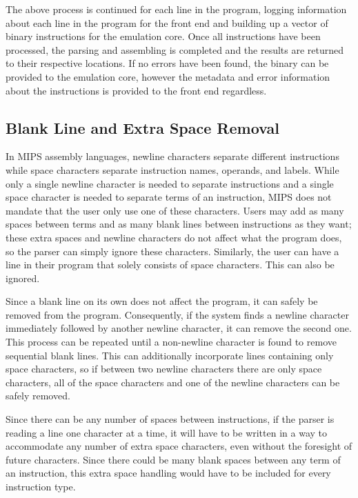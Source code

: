 \documentclass[
    parskip=half,
    fontsize=12pt,
    titlepage=firstiscover,
    toc=bibliography,
    numbers=endperiod
]{scrartcl}
\begin{document}
The above process is continued for each line in the program, logging
information about each line in the program for the front end and
building up a vector of binary instructions for the emulation core. Once
all instructions have been processed, the parsing and assembling is
completed and the results are returned to their respective locations. If
no errors have been found, the binary can be provided to the emulation
core, however the metadata and error information about the instructions
is provided to the front end regardless.

\subsection{Blank Line and Extra Space Removal}

In MIPS assembly languages, newline characters separate different
instructions while space characters separate instruction names,
operands, and labels. While only a single newline character is needed to
separate instructions and a single space character is needed to separate
terms of an instruction, MIPS does not mandate that the user only use
one of these characters. Users may add as many spaces between terms and
as many blank lines between instructions as they want; these extra
spaces and newline characters do not affect what the program does, so
the parser can simply ignore these characters. Similarly, the user can
have a line in their program that solely consists of space characters.
This can also be ignored.

Since a blank line on its own does not affect the program, it can safely
be removed from the program. Consequently, if the system finds a newline
character immediately followed by another newline character, it can
remove the second one. This process can be repeated until a non-newline
character is found to remove sequential blank lines. This can
additionally incorporate lines containing only space characters, so if
between two newline characters there are only space characters, all of
the space characters and one of the newline characters can be safely
removed.

Since there can be any number of spaces between instructions, if the
parser is reading a line one character at a time, it will have to be
written in a way to accommodate any number of extra space characters,
even without the foresight of future characters. Since there could be
many blank spaces between any term of an instruction, this extra space
handling would have to be included for every instruction type.
\end{document}
